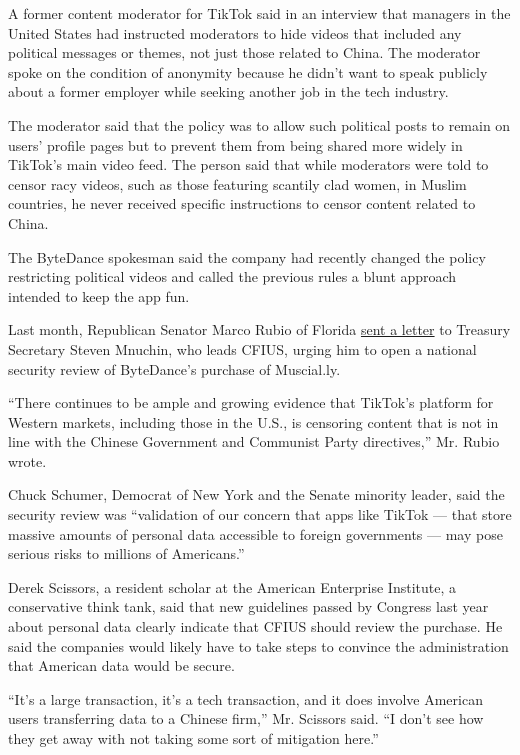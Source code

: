 A former content moderator for TikTok said in an interview that managers
in the United States had instructed moderators to hide videos that
included any political messages or themes, not just those related to
China. The moderator spoke on the condition of anonymity because he
didn't want to speak publicly about a former employer while seeking
another job in the tech industry.

The moderator said that the policy was to allow such political posts to
remain on users' profile pages but to prevent them from being shared
more widely in TikTok's main video feed. The person said that while
moderators were told to censor racy videos, such as those featuring
scantily clad women, in Muslim countries, he never received specific
instructions to censor content related to China.

The ByteDance spokesman said the company had recently changed the policy
restricting political videos and called the previous rules a blunt
approach intended to keep the app fun.

Last month, Republican Senator Marco Rubio of Florida
\href{https://www.rubio.senate.gov/public/_cache/files/9ba023e4-2f4b-404a-a8c0-e87ea784f440/FCEFFE1F54F3899795B4E5F1F1804630.20191009-letter-to-secretary-mnuchin-re-tiktok.pdf}{sent
a letter} to Treasury Secretary Steven Mnuchin, who leads CFIUS, urging
him to open a national security review of ByteDance's purchase of
Muscial.ly.

``There continues to be ample and growing evidence that TikTok's
platform for Western markets, including those in the U.S., is censoring
content that is not in line with the Chinese Government and Communist
Party directives,'' Mr. Rubio wrote.

Chuck Schumer, Democrat of New York and the Senate minority leader, said
the security review was ``validation of our concern that apps like
TikTok --- that store massive amounts of personal data accessible to
foreign governments --- may pose serious risks to millions of
Americans.''

Derek Scissors, a resident scholar at the American Enterprise Institute,
a conservative think tank, said that new guidelines passed by Congress
last year about personal data clearly indicate that CFIUS should review
the purchase. He said the companies would likely have to take steps to
convince the administration that American data would be secure.

``It's a large transaction, it's a tech transaction, and it does involve
American users transferring data to a Chinese firm,'' Mr. Scissors said.
``I don't see how they get away with not taking some sort of mitigation
here.''

